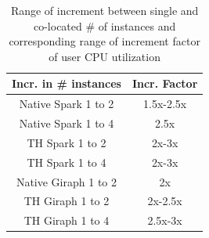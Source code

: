 \begin{table}[thbp]
  \centering
  \caption{Range of increment between single and co-located \# of instances and corresponding range of increment factor of user CPU utilization}
  \label{tab:user_factors}
  \begin{tabular}{|c|c|}
    \hline
    \textbf{Incr. in # instances} & \textbf{Incr. Factor} \\
    \hline
    Native Spark 1 to 2  & 1.5x-2.5x \\
    Native Spark 1 to 4 & 2.5x \\
    TH Spark 1 to 2 & 2x-3x \\
    TH Spark 1 to 4 & 2x-3x \\
    Native Giraph 1 to 2 & 2x \\
    TH Giraph 1 to 2 & 2x-2.5x \\
    TH Giraph 1 to 4 & 2.5x-3x \\
    \hline
  \end{tabular}
\end{table}


